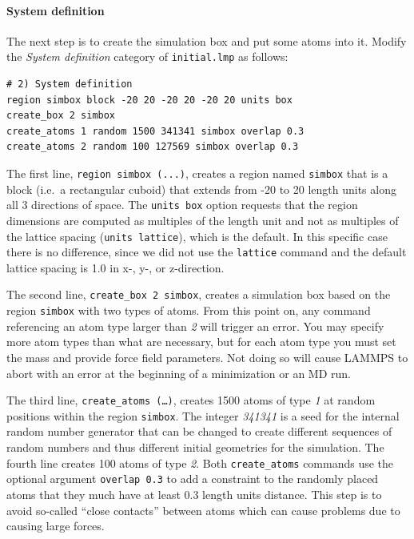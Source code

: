 \documentclass[9pt,tutorial]{livecoms}
\newcommand{\lmpcmd}[1]{\hspace{0pt}\colorbox{listing}{\textcolor{command}{\texttt{#1}}}\hspace{0pt}} %
\newcommand{\flecmd}[1]{\textcolor{command}{\texttt{#1}}} %
\begin{document}
\paragraph{System definition}

The next step is to create the simulation box and put some atoms into it.
Modify the \textit{System definition} category of \flecmd{initial.lmp} as follows:
\begin{lstlisting}
# 2) System definition
region simbox block -20 20 -20 20 -20 20 units box
create_box 2 simbox
create_atoms 1 random 1500 341341 simbox overlap 0.3
create_atoms 2 random 100 127569 simbox overlap 0.3
\end{lstlisting}

The first line, \lmpcmd{region simbox (...)}, creates a region
named \lmpcmd{simbox} that is a block (i.e.~a rectangular
cuboid) that extends from -20 to 20 length units along all 3 directions
of space.  The \lmpcmd{units box} option requests that the region
dimensions are computed as multiples of the length unit and not as
multiples of the lattice spacing (\lmpcmd{units lattice}), which is the
default.  In this specific case there is no difference, since we did not
use the \lmpcmd{lattice} command and the default lattice spacing is 1.0
in x-, y-, or z-direction.

The second line, \lmpcmd{create\_box 2 simbox}, creates a simulation box
based on the region \lmpcmd{simbox} with two types of atoms.  From this
point on, any command referencing an atom type larger than \textit{2}
will trigger an error.  You may specify more atom types than what are
necessary, but for each atom type you must set the mass and provide
force field parameters. Not doing so will cause LAMMPS to abort with an
error at the beginning of a minimization or an MD run.

The third line, \lmpcmd{create\_atoms (\dots)}, creates 1500 atoms of type
\textit{1} at random positions within the region
\lmpcmd{simbox}.  The integer \textit{341341} is a seed for the
internal random number generator that can be changed to create different
sequences of random numbers and thus different initial geometries for
the simulation.  The fourth line creates 100 atoms of type \textit{2}.
Both \lmpcmd{create\_atoms} commands use the optional argument
\lmpcmd{overlap 0.3} to add a constraint to the randomly placed atoms
that they much have at least 0.3 length units distance.  This step is to
avoid so-called ``close contacts'' between atoms which can cause
problems due to causing large forces.
\end{document}
